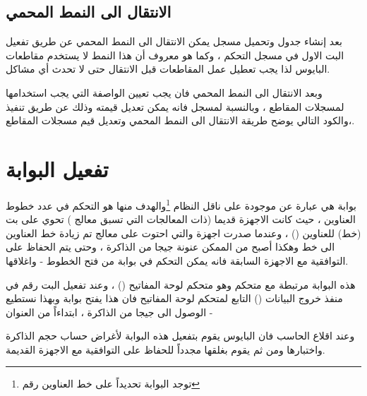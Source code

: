 \documentclass[document.tex]{subfiles}
\begin{document}
 
\subsection{الانتقال الى النمط المحمي}
بعد إنشاء جدول  وتحميل مسجل  يمكن الانتقال الى النمط المحمي عن طريق تفعيل البت الاول في مسجل التحكم ، وكما هو معروف أن هذا النمط لا يستخدم مقاطعات البايوس لذا يجب تعطيل عمل المقاطعات قبل الانتقال حتى لا تحدث أي مشاكل.

وبعد الانتقال الى النمط المحمي فان يجب تعيين الواصفة التي يجب استخدامها لمسجلات المقاطع ، وبالنسبة لمسجل  فانه يمكن تعديل قيمته وذلك عن طريق تنفيذ  ،والكود التالي يوضح طريقة الانتقال الى النمط المحمي وتعديل قيم مسجلات المقاطع.

 
\begin{english}
\lstset{numberstyle=\tiny,numbersep=5pt,tabsize=2,extendedchars=true,breaklines=true,frame=b,showspaces=false, showtabs=false,xleftmargin=10pt,framexleftmargin=10pt,framexrightmargin=5pt,framexbottommargin=4pt,showstringspaces=false,language=[x86masm]Assembler}


\end{english}


\section{تفعيل البوابة }
بوابة  هي عبارة عن  موجودة على ناقل النظام  \footnote{توجد البوابة تحديداً على خط العناوين رقم }والهدف منها هو التحكم في عدد خطوط العناوين ، حيث كانت الاجهزة قديما (ذات المعالجات التي تسبق معالج ) تحوي على  بت (خط) للعناوين () ، وعندما صدرت اجهزة  والتي احتوت على معالج  تم زيادة خط العناوين الى  خط وهكذا أصبح من الممكن عنونة  جيجا من الذاكرة ، وحتى يتم الحفاظ على التوافقية مع الاجهزة السابقة فانه يمكن التحكم في بوابة  من فتح الخطوط - واغلاقها.

هذه البوابة مرتبطة مع متحكم  وهو متحكم لوحة المفاتيح () ، وعند تفعيل البت رقم  في منفذ خروج البيانات () التابع لمتحكم لوحة المفاتيح فان هذا يفتح بوابة  وبهذا نستطيع الوصول الى  جيجا من الذاكرة ، ابتداءاً من العنوان - 

وعند اقلاع الحاسب فان البايوس يقوم بتفعيل هذه البوابة لأغراض حساب حجم الذاكرة واختبارها ومن ثم يقوم بغلقها مجدداً للحفاظ على التوافقية مع الاجهزة القديمة.
\end{document}
